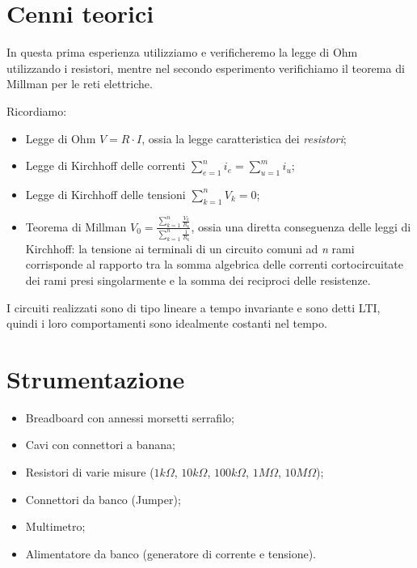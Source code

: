     \section{Cenni teorici}
    In questa prima esperienza utilizziamo e verificheremo la legge di Ohm utilizzando i resistori, mentre nel secondo esperimento
    verifichiamo il teorema di Millman per le reti elettriche. \par
    Ricordiamo:
    \begin{itemize}
        \item Legge di Ohm $V = R \cdot I$, ossia la legge caratteristica dei \textit{resistori};
        \item Legge di Kirchhoff delle correnti $\sum_{e = 1}^{n} i_e = \sum_{u = 1}^{m} i_u $;
        \item Legge di Kirchhoff delle tensioni $\sum_{k = 1}^{n} V_k = 0 $;
        \item Teorema di Millman $V_0 = \frac{\sum_{k = 1}^{n} \frac{V_k}{R_k} }{\sum_{k = 1}^{n} \frac{1}{R_k} }$, ossia una diretta conseguenza delle leggi di Kirchhoff: la tensione ai terminali di un circuito comuni ad \textit{n} rami
                corrisponde al rapporto tra la somma algebrica delle correnti cortocircuitate dei rami presi singolarmente e la somma dei reciproci delle resistenze.
    \end{itemize}
    I circuiti realizzati sono di tipo lineare a tempo invariante e sono detti LTI, quindi i loro comportamenti sono idealmente costanti nel tempo.
    
    
    \newpage
    \section{Strumentazione}
    \begin{itemize}
        \item Breadboard con annessi morsetti serrafilo;
        \item Cavi con connettori a banana;
        \item Resistori di varie misure ($1k\Omega$, $10k\Omega$, $100k\Omega$, $1M\Omega$, $10M\Omega$);
        \item Connettori da banco (Jumper);
        \item Multimetro;
        \item Alimentatore da banco (generatore di corrente e tensione).
    \end{itemize}

